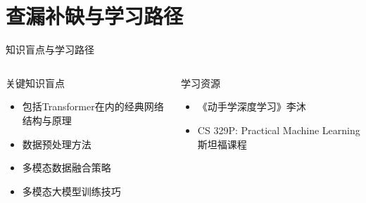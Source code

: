 \documentclass[aspectratio=169,AutoFakeBold]{beamer}
\begin{document}
\section{查漏补缺与学习路径}
\begin{frame}{知识盲点与学习路径}
    \begin{columns}[T]
        \begin{column}{.5\textwidth}
            \begin{block}{关键知识盲点}
                \begin{itemize}
                    \item 包括Transformer在内的经典网络结构与原理
                    \item 数据预处理方法
                    \item 多模态数据融合策略
                    \item 多模态大模型训练技巧
                \end{itemize}
            \end{block}
        \end{column}
        \begin{column}{.5\textwidth}
            \begin{block}{学习资源}
                \begin{itemize}
                    \item 《动手学深度学习》李沐
                    \item CS 329P: Practical Machine Learning  斯坦福课程
                \end{itemize}
            \end{block}
        \end{column}
    \end{columns}
\end{frame}

    
\end{document}
